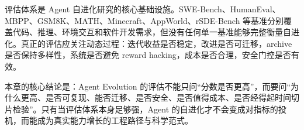 评估体系是 Agent 自进化研究的核心基础设施。SWE-Bench、HumanEval、MBPP、GSM8K、MATH、Minecraft、AppWorld、rSDE-Bench 等基准分别覆盖代码、推理、环境交互和软件开发需求，但没有任何单一基准能够完整衡量自进化。真正的评估应关注动态过程：迭代收益是否稳定，改进是否可迁移，archive 是否保持多样性，系统是否避免 reward hacking，成本是否合理，安全门控是否有效。

本章的核心结论是：Agent Evolution 的评估不能只问“分数是否更高”，而要问“为什么更高、是否可复现、能否迁移、是否安全、是否值得成本、是否经得起时间切片检验”。只有当评估体系本身足够强，Agent 的自进化才不会变成对指标的投机，而能成为真实能力增长的工程路径与科学范式。
